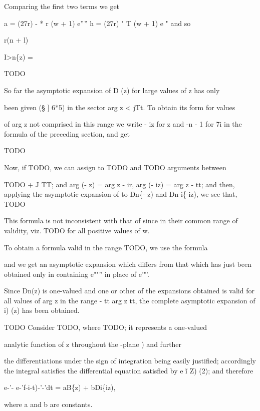 Comparing the first two terms we get

a = (27r) - * r (w + 1) e'''' h = (27r) "  T (w + 1) e " and so

r(n + l)

I>n\{z) =

TODO

So far the
asymptotic expansion of D (z) for large values of z has only

been given (§ ] 6*5) in the sector arg z < jTt. To obtain its form for
values

of arg z not comprised in this range we write - iz for z and -n - 1
for 7i in the formula of the preceding section, and get

TODO

Now, if TODO, we can assign to TODO and TODO arguments between

TODO + J TT; and arg (- z) = arg z - ir, arg (- iz) = arg z - tt;
and then, applying the asymptotic expansion of  to Dn\{- z) and
Dn-i\{-iz), we see that, TODO

%
%

This formula is not inconsistent with that of  since in their
common range of validity, viz. TODO for all positive values of w.

To obtain a formula valid in the range TODO, we use the formula

and we get an asymptotic expansion which differs from that which has
just been obtained only in containing e""'' in place of e'"'.

Since Dn(z) is one-valued and one or other of the expansions obtained
is valid for all values of arg z in the range - tt  arg z tt, the
complete asymptotic expansion of i) (z) has been obtained.


TODO Consider TODO, where TODO; it represents a one-valued

analytic function of z throughout the -plane ) and further

the differentiations under the sign of integration being easily
justified; accordingly the integral satisfies the differential
equation satisfied by e \~ i Z) (2); and therefore

e-'- e-'f-i-t)-'-'dt = aB\{z) + bDi\{iz),

where a and b are constants.

